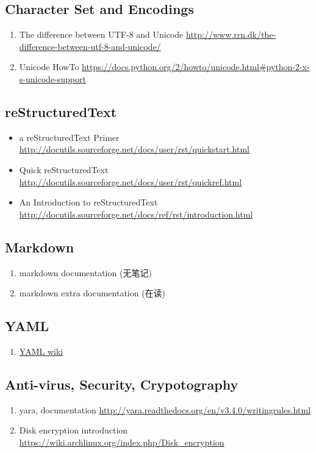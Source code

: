 \documentclass{article}
\begin{document}
\subsection{Character Set and Encodings}
\begin{enumerate}
    \item The difference between UTF-8 and Unicode \url{http://www.rrn.dk/the-difference-between-utf-8-and-unicode/}
    \item Unicode HowTo \url{https://docs.python.org/2/howto/unicode.html#python-2-x-s-unicode-support}
\end{enumerate}
%
\subsection{reStructuredText}
\begin{itemize}
    \item a reStructuredText Primer \url{http://docutils.sourceforge.net/docs/user/rst/quickstart.html}
    \item Quick reStructuredText \url{http://docutils.sourceforge.net/docs/user/rst/quickref.html}
    \item An Introduction to reStructuredText \url{http://docutils.sourceforge.net/docs/ref/rst/introduction.html}
\end{itemize}
%
\subsection{Markdown}
\begin{enumerate}
    \item markdown documentation (无笔记)
    \item markdown extra documentation (在读)
\end{enumerate}
\subsection{YAML}
\begin{enumerate}
    \item \href{https://en.wikipedia.org/wiki/YAML}{YAML wiki}
\end{enumerate}
\subsection{Anti-virus, Security, Crypotography}
\begin{enumerate}
    \item yara, documentation \url{http://yara.readthedocs.org/en/v3.4.0/writingrules.html}
    \item Disk encryption introduction \url{https://wiki.archlinux.org/index.php/Disk_encryption}
\end{enumerate}
\end{document}
